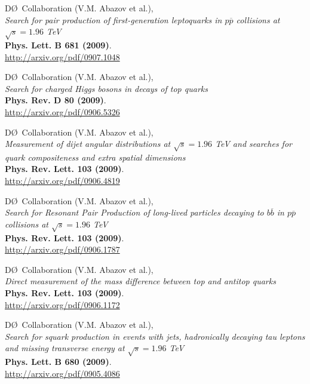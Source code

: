\documentclass[12pt]{article}
\begin{document}
%
D\O~Collaboration (V.M. Abazov et al.), \\
\textsl{Search for pair production of first-generation leptoquarks in $p\overline{p}$ collisions at $\sqrt{s}=1.96$ TeV}\\
\textbf{Phys. Lett. B 681 (2009)}.\\
{\small{\url{http://arxiv.org/pdf/0907.1048}}}\vspace{4mm}

%
D\O~Collaboration (V.M. Abazov et al.), \\
\textsl{Search for charged Higgs bosons in decays of top quarks}\\
\textbf{Phys. Rev. D 80 (2009)}.\\
{\small{\url{http://arxiv.org/pdf/0906.5326}}}\vspace{4mm}

%
D\O~Collaboration (V.M. Abazov et al.), \\
\textsl{Measurement of dijet angular distributions at $\sqrt{s}=1.96$ TeV and searches for quark compositeness and extra spatial dimensions}\\
\textbf{Phys. Rev. Lett. 103 (2009)}.\\
{\small{\url{http://arxiv.org/pdf/0906.4819}}}\vspace{4mm}

%
D\O~Collaboration (V.M. Abazov et al.), \\
\textsl{Search for Resonant Pair Production of long-lived particles decaying to $b\overline{b}$ in $p\overline{p}$ collisions at $\sqrt{s}=1.96$ TeV}\\
\textbf{Phys. Rev. Lett. 103 (2009)}.\\
{\small{\url{http://arxiv.org/pdf/0906.1787}}}\vspace{4mm}

%
D\O~Collaboration (V.M. Abazov et al.), \\
\textsl{Direct measurement of the mass difference between top and antitop quarks}\\
\textbf{Phys. Rev. Lett. 103 (2009)}.\\
{\small{\url{http://arxiv.org/pdf/0906.1172}}}\vspace{4mm}

%
D\O~Collaboration (V.M. Abazov et al.), \\
\textsl{Search for squark production in events with jets, hadronically decaying tau leptons and missing transverse energy at $\sqrt{s}=1.96$ TeV}\\
\textbf{Phys. Lett. B 680 (2009)}.\\
{\small{\url{http://arxiv.org/pdf/0905.4086}}}\vspace{4mm}
\end{document}
